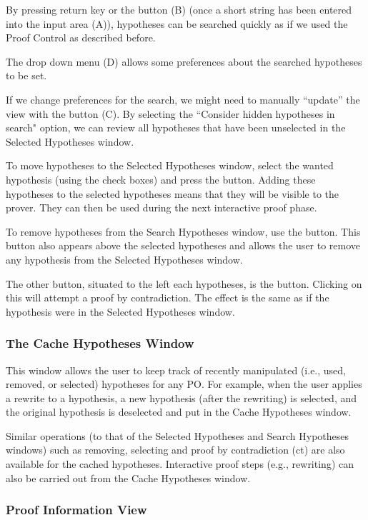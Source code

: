 By pressing return key or the button (B) (once a short string has been entered into the input area (A)), hypotheses can be searched quickly as if we used the Proof Control as described before.

The drop down menu (D) allows some preferences about the searched hypotheses to be set.

If we change preferences for the search, we might need to manually ``update'' the view with the button (C). By selecting the ``Consider hidden hypotheses in search" option, we can review all hypotheses that have been unselected in the \textsf{Selected Hypotheses} window.

To move hypotheses to the \textsf{Selected Hypotheses} window, select the wanted hypothesis (using the check boxes) and press the  button. Adding these hypotheses to the selected hypotheses means that they will be visible to the prover. They can then be used during the next interactive proof phase.

To remove hypotheses from the \textsf{Search Hypotheses} window, use the  button. This button also appears above the selected hypotheses and allows the user to remove any hypothesis from the \textsf{Selected Hypotheses} window.

The other button, situated to the left each hypotheses, is the  button. Clicking on this will attempt a proof by contradiction. The effect is the same as if the hypothesis were in the \textsf{Selected Hypotheses} window. 

\subsubsection{The Cache Hypotheses Window}

This window allows the user to keep track of recently manipulated (i.e., used, removed, or selected) hypotheses for any PO. For example, when the user applies a rewrite to a hypothesis, a new hypothesis (after the rewriting) is selected, and the original hypothesis is deselected and put in the \textsf{Cache Hypotheses} window.

Similar operations (to that of the \textsf{Selected Hypotheses} and \textsf{Search Hypotheses} windows) such as removing, selecting and proof by contradiction (ct) are also available for the cached hypotheses. Interactive proof steps (e.g., rewriting) can also be carried out from the \textsf{Cache Hypotheses} window.

\subsubsection{Proof Information View}

